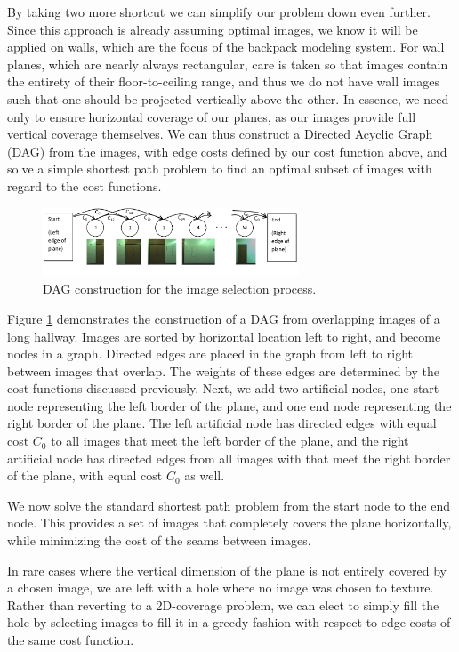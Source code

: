 \documentclass[10pt,twocolumn,letterpaper]{article}
\begin{document}
By taking two more shortcut we can simplify our problem down even
further. Since this approach is already assuming optimal images, we
know it will be applied on walls, which are the focus of the backpack
modeling system. For wall planes, which are nearly always rectangular,
care is taken so that images contain the entirety of their
floor-to-ceiling range, and thus we do not have wall images such that
one should be projected vertically above the other. In essence, we
need only to ensure horizontal coverage of our planes, as our images
provide full vertical coverage themselves. We can thus construct a
Directed Acyclic Graph (DAG) from the images, with edge costs defined
by our cost function above, and solve a simple shortest path problem
to find an optimal subset of images with regard to the cost functions.

\begin{figure}
  \centering
  \includegraphics[width=3in]{dagCreation.pdf}
  \caption{DAG construction for the image selection process.}
  \label{fig:dagCreation}
\end{figure}

Figure \ref{fig:dagCreation} demonstrates the construction of a DAG
from overlapping images of a long hallway. Images are sorted by
horizontal location left to right, and become nodes in a
graph. Directed edges are placed in the graph from left to right
between images that overlap. The weights of these edges are determined
by the cost functions discussed previously. Next, we add two
artificial nodes, one start node representing the left border of the
plane, and one end node representing the right border of the
plane. The left artificial node has directed edges with equal cost
$C_0$ to all images that meet the left border of the plane, and the
right artificial node has directed edges from all images with that
meet the right border of the plane, with equal cost $C_0$ as well.

We now solve the standard shortest path problem from the start node to
the end node. This provides a set of images that completely covers the
plane horizontally, while minimizing the cost of the seams between
images.

In rare cases where the vertical dimension of the plane is not
entirely covered by a chosen image, we are left with a hole where no
image was chosen to texture. Rather than reverting to a 2D-coverage
problem, we can elect to simply fill the hole by selecting images to
fill it in a greedy fashion with respect to edge costs of the same
cost function.
\end{document}
